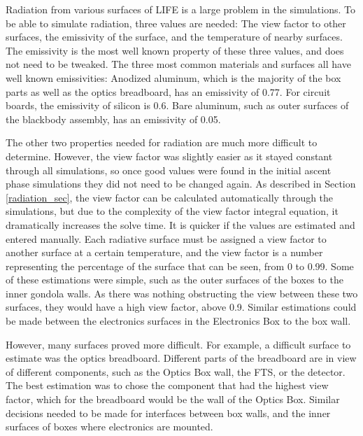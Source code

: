 Radiation from various surfaces of LIFE is a large problem in the simulations. To be able to simulate radiation, three values are needed: The view factor to other surfaces, the emissivity of the surface, and the temperature of nearby surfaces. The emissivity is the most well known property of these three values, and does not need to be tweaked. The three most common materials and surfaces all have well known emissivities: Anodized aluminum, which is the majority of the box parts as well as the optics breadboard, has an emissivity of 0.77. For circuit boards, the emissivity of silicon is 0.6. Bare aluminum, such as outer surfaces of the blackbody assembly, has an emissivity of 0.05. 

The other two properties needed for radiation are much more difficult to determine. However, the view factor was slightly easier as it stayed constant through all simulations, so once good values were found in the initial ascent phase simulations they did not need to be changed again. As described in Section \ref{radiation_sec}, the view factor can be calculated automatically through the simulations, but due to the complexity of the view factor integral equation, it dramatically increases the solve time. It is quicker if the values are estimated and entered manually. Each radiative surface must be assigned a view factor to another surface at a certain temperature, and the view factor is a number representing the percentage of the surface that can be seen, from 0 to 0.99. Some of these estimations were simple, such as the outer surfaces of the boxes to the inner gondola walls. As there was nothing obstructing the view between these two surfaces, they would have a high view factor, above 0.9. Similar estimations could be made between the electronics surfaces in the Electronics Box to the box wall.

However, many surfaces proved more difficult. For example, a difficult surface to estimate was the optics breadboard. Different parts of the breadboard are in view of different components, such as the Optics Box wall, the FTS, or the detector. The best estimation was to chose the component that had the highest view factor, which for the breadboard would be the wall of the Optics Box. Similar decisions needed to be made for interfaces between box walls, and the inner surfaces of boxes where electronics are mounted.

